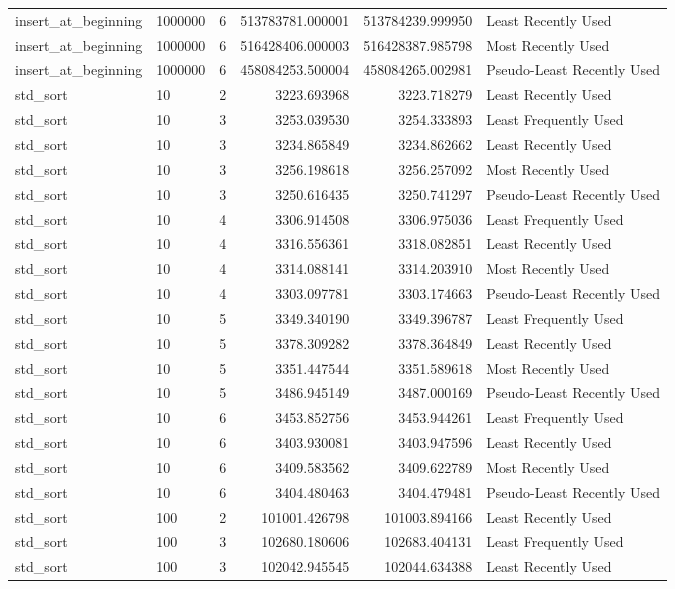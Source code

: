 \begin{tabular}{llrrrl}
insert_at_beginning & 1000000 & 6 & 513783781.000001 & 513784239.999950 & Least Recently Used \\
insert_at_beginning & 1000000 & 6 & 516428406.000003 & 516428387.985798 & Most Recently Used \\
insert_at_beginning & 1000000 & 6 & 458084253.500004 & 458084265.002981 & Pseudo-Least Recently Used \\
std_sort & 10 & 2 & 3223.693968 & 3223.718279 & Least Recently Used \\
std_sort & 10 & 3 & 3253.039530 & 3254.333893 & Least Frequently Used \\
std_sort & 10 & 3 & 3234.865849 & 3234.862662 & Least Recently Used \\
std_sort & 10 & 3 & 3256.198618 & 3256.257092 & Most Recently Used \\
std_sort & 10 & 3 & 3250.616435 & 3250.741297 & Pseudo-Least Recently Used \\
std_sort & 10 & 4 & 3306.914508 & 3306.975036 & Least Frequently Used \\
std_sort & 10 & 4 & 3316.556361 & 3318.082851 & Least Recently Used \\
std_sort & 10 & 4 & 3314.088141 & 3314.203910 & Most Recently Used \\
std_sort & 10 & 4 & 3303.097781 & 3303.174663 & Pseudo-Least Recently Used \\
std_sort & 10 & 5 & 3349.340190 & 3349.396787 & Least Frequently Used \\
std_sort & 10 & 5 & 3378.309282 & 3378.364849 & Least Recently Used \\
std_sort & 10 & 5 & 3351.447544 & 3351.589618 & Most Recently Used \\
std_sort & 10 & 5 & 3486.945149 & 3487.000169 & Pseudo-Least Recently Used \\
std_sort & 10 & 6 & 3453.852756 & 3453.944261 & Least Frequently Used \\
std_sort & 10 & 6 & 3403.930081 & 3403.947596 & Least Recently Used \\
std_sort & 10 & 6 & 3409.583562 & 3409.622789 & Most Recently Used \\
std_sort & 10 & 6 & 3404.480463 & 3404.479481 & Pseudo-Least Recently Used \\
std_sort & 100 & 2 & 101001.426798 & 101003.894166 & Least Recently Used \\
std_sort & 100 & 3 & 102680.180606 & 102683.404131 & Least Frequently Used \\
std_sort & 100 & 3 & 102042.945545 & 102044.634388 & Least Recently Used \\

\end{tabular}
